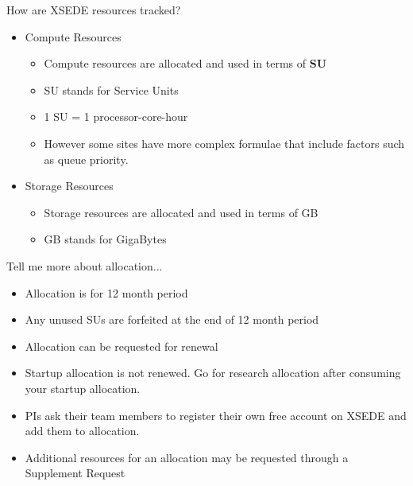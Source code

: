 \documentclass[compress,10pt]{beamer}
\begin{document}
\begin{frame}{How are XSEDE resources tracked?}
\begin{itemize}
\pause
\item Compute Resources
\begin{itemize}
\pause
\item Compute resources are allocated and used in terms of \textbf{SU}
\item SU stands for Service Units
\item 1 SU = 1 processor-core-hour

\pause
\item However some sites have more complex formulae that include factors such as queue priority.
\end{itemize}

\pause
\item Storage Resources
\begin{itemize}
\item Storage resources are allocated and used in terms of GB
\item GB stands for GigaBytes
\end{itemize}

\end{itemize}

\end{frame}

\begin{frame}{Tell me more about allocation...}
\begin{itemize}
\pause

  \item Allocation is for 12 month period
\pause
  \item Any unused SUs are forfeited at the end of 12 month period
  \pause
  \item Allocation can be requested for renewal
  \pause
  \item Startup allocation is not renewed. Go for research allocation after consuming your startup allocation.
  \pause
  \item PIs ask their team members to register their own free account on XSEDE and add them to allocation.
  \pause
  \item Additional resources for an allocation may be requested through a Supplement Request

 \end{itemize}
\end{frame}
\end{document}
